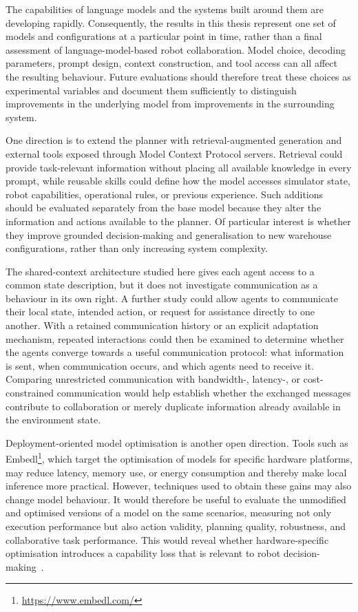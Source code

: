 The capabilities of language models and the systems built around them are developing rapidly. Consequently, the results in this thesis represent one set of models and configurations at a particular point in time, rather than a final assessment of language-model-based robot collaboration. Model choice, decoding parameters, prompt design, context construction, and tool access can all affect the resulting behaviour. Future evaluations should therefore treat these choices as experimental variables and document them sufficiently to distinguish improvements in the underlying model from improvements in the surrounding system.

One direction is to extend the planner with retrieval-augmented generation and external tools exposed through Model Context Protocol servers. Retrieval could provide task-relevant information without placing all available knowledge in every prompt, while reusable skills could define how the model accesses simulator state, robot capabilities, operational rules, or previous experience. Such additions should be evaluated separately from the base model because they alter the information and actions available to the planner. Of particular interest is whether they improve grounded decision-making and generalisation to new warehouse configurations, rather than only increasing system complexity.

The shared-context architecture studied here gives each agent access to a common state description, but it does not investigate communication as a behaviour in its own right. A further study could allow agents to communicate their local state, intended action, or request for assistance directly to one another. With a retained communication history or an explicit adaptation mechanism, repeated interactions could then be examined to determine whether the agents converge towards a useful communication protocol: what information is sent, when communication occurs, and which agents need to receive it. Comparing unrestricted communication with bandwidth-, latency-, or cost-constrained communication would help establish whether the exchanged messages contribute to collaboration or merely duplicate information already available in the environment state.

Deployment-oriented model optimisation is another open direction. Tools such as Embedl\footnote{\url{https://www.embedl.com/}},
which target the optimisation of models for specific hardware platforms,
may reduce latency, memory use, or energy consumption and thereby make local inference more practical. However, techniques used to obtain these gains may also change model behaviour. It would therefore be useful to evaluate the unmodified and optimised versions of a model on the same scenarios, measuring not only execution performance but also action validity, planning quality, robustness, and collaborative task performance. This would reveal whether hardware-specific optimisation introduces a capability loss that is relevant to robot decision-making~\cite{dawane2026onddeviceslm}.

